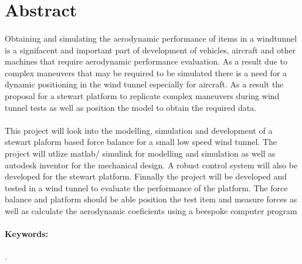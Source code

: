 
\section*{Abstract}
\label{sec:Abstract}
\paragraph{}Obtaining and simulating the aerodynamic performance of items in a windtunnel  is a signifacent and important part of development of vehicles, aircraft and other machines that require aerodynamic performance evaluation. As a result due to complex maneuvers that may be required to be simulated there is a need for a dynamic positioning in the wind tunnel especially for aircraft. As a result the proposal for a stewart platform to replicate complex maneuvers during wind tunnel tests as well as position the model to obtain the required data.
\paragraph{}
This project will look into the modelling, simulation and development of a stewart plaform based force balance for a small low speed wind tunnel. The project will utlize matlab/ simulink for modelling and simulation as well as autodesk inventor for the mechanical design. A robust control system will also be developed for the stewart platform. Finnally  the project will be developed and tested in a wind tunnel to evaluate the performance of the platform. The force balance and platform should be able position the test item and measure forces as well as calculate the aerodynamic coeficients using a beespoke computer program

\paragraph{\textbf{Keywords:}} .




